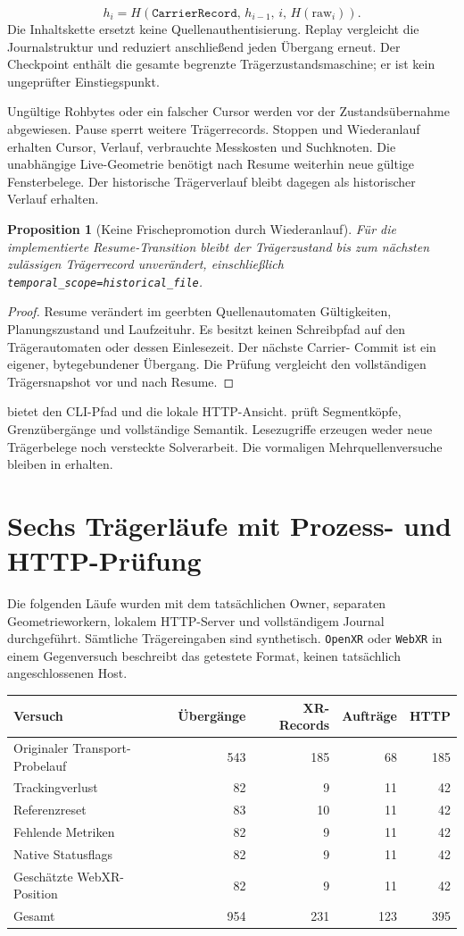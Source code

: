 \documentclass[11pt,a4paper]{article}
\newcommand{\nextsection}[2]{\clearpage{\color{accent}\small\textsf{#1}}\section{#2}}
\newtheorem{proposition}{Proposition}[section]
\begin{document}
\[
 h_i=H(\texttt{CarrierRecord},\,h_{i-1},\,i,\,H(\mathrm{raw}_i)).
\]
Die Inhaltskette ersetzt keine Quellenauthentisierung. Replay
vergleicht die Journalstruktur und reduziert anschließend jeden
Übergang erneut. Der Checkpoint enthält die gesamte begrenzte
Trägerzustandsmaschine; er ist kein ungeprüfter Einstiegspunkt.

Ungültige Rohbytes oder ein falscher Cursor werden vor der
Zustandsübernahme abgewiesen. Pause sperrt weitere Trägerrecords.
Stoppen und Wiederanlauf erhalten Cursor, Verlauf, verbrauchte
Messkosten und Suchknoten. Die unabhängige Live-Geometrie benötigt
nach Resume weiterhin neue gültige Fensterbelege. Der historische
Trägerverlauf bleibt dagegen als historischer Verlauf erhalten.

\begin{proposition}[Keine Frischepromotion durch Wiederanlauf]
Für die implementierte Resume-Transition bleibt der Trägerzustand
bis zum nächsten zulässigen Trägerrecord unverändert, einschließlich
\texttt{temporal\_scope=historical\_file}.
\end{proposition}
\begin{proof}
Resume verändert im geerbten Quellenautomaten Gültigkeiten,
Planungszustand und Laufzeituhr. Es besitzt keinen Schreibpfad auf
den Trägerautomaten oder dessen Einlesezeit. Der nächste Carrier-
Commit ist ein eigener, bytegebundener Übergang. Die Prüfung
vergleicht den vollständigen Trägersnapshot vor und nach Resume.
\end{proof}

 bietet den CLI-Pfad und die lokale
HTTP-Ansicht.  prüft Segmentköpfe,
Grenzübergänge und vollständige Semantik. Lesezugriffe erzeugen
weder neue Trägerbelege noch versteckte Solverarbeit. Die vormaligen
Mehrquellenversuche bleiben in  erhalten.

\nextsection{88 / AUSGEFÜHRTE VERSUCHE}{Sechs Trägerläufe mit Prozess- und HTTP-Prüfung}
Die folgenden Läufe wurden mit dem tatsächlichen Owner,
separaten Geometrieworkern, lokalem HTTP-Server und vollständigem
Journal durchgeführt. Sämtliche Trägereingaben sind synthetisch.
\texttt{OpenXR} oder \texttt{WebXR} in einem Gegenversuch beschreibt
das getestete Format, keinen tatsächlich angeschlossenen Host.

\begin{tabularx}{\linewidth}{@{}Yrrrr@{}}\toprule
Versuch & Übergänge & XR-Records & Aufträge & HTTP\\\midrule
Originaler Transport-Probelauf & 543 & 185 & 68 & 185\\
Trackingverlust & 82 & 9 & 11 & 42\\
Referenzreset & 83 & 10 & 11 & 42\\
Fehlende Metriken & 82 & 9 & 11 & 42\\
Native Statusflags & 82 & 9 & 11 & 42\\
Geschätzte WebXR-Position & 82 & 9 & 11 & 42\\\midrule
Gesamt & 954 & 231 & 123 & 395\\\bottomrule
\end{tabularx}
\end{document}
